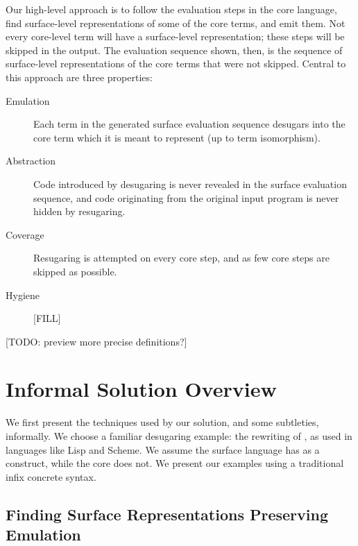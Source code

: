 Our high-level approach is to follow the evaluation steps in the core
language, find surface-level representations of some of the core
terms, and emit them. Not every core-level term will have a
surface-level representation; these steps will be skipped in the
output. The evaluation sequence shown, then, is the sequence of
surface-level representations of the core terms that were not
skipped. Central to this approach are three properties:

\begin{description}
\item[Emulation] Each term in the generated surface evaluation
  sequence desugars into the core term which it is meant to represent
  (up to term isomorphism).
\item[Abstraction] Code introduced by desugaring is never revealed in the
  surface evaluation sequence, and code originating from the original
  input program is never hidden by resugaring.
\item[Coverage] Resugaring is attempted on every core step, and as few
  core steps are skipped as possible.
\item[Hygiene] [FILL]
\end{description}
[TODO: preview more precise definitions?]

\section{Informal Solution Overview}
\label{sec:reval-exposition}

We first present the techniques used by our solution, and some subtleties,
informally. We choose a familiar desugaring example: the rewriting
of , as used in languages like Lisp and Scheme. We assume
the surface language has  as a construct, while the core does
not. We present our examples using a traditional infix concrete syntax.

\subsection{Finding Surface Representations Preserving Emulation}

